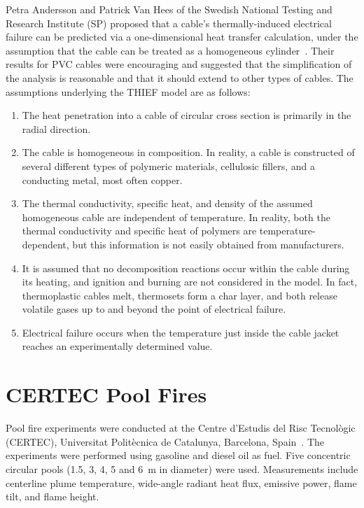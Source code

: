 Petra Andersson and Patrick Van Hees of the Swedish National Testing and Research Institute (SP) proposed that a cable's thermally-induced electrical failure can be predicted via a one-dimensional heat transfer calculation, under the assumption that the cable can be treated as a homogeneous cylinder~\cite{Andersson:2005}. Their results for PVC cables were encouraging and suggested that the simplification of the analysis is reasonable and that it should extend to other types of cables. The assumptions underlying the THIEF model are as follows:
\begin{enumerate}
\item The heat penetration into a cable of circular cross section is primarily in the radial direction.
\item The cable is homogeneous in composition. In reality, a cable is constructed of several different types of polymeric materials, cellulosic fillers, and a conducting metal, most often copper.
\item The thermal conductivity, specific heat, and density of the assumed homogeneous cable are independent of temperature. In reality, both the thermal conductivity and specific heat of polymers are temperature-dependent, but this information is not easily obtained from manufacturers.
\item It is assumed that no decomposition reactions occur within the cable during its heating, and ignition and burning are not considered in the model. In fact, thermoplastic cables melt, thermosets form a char layer, and both release volatile gases up to and beyond the point of electrical failure.
\item Electrical failure occurs when the temperature just inside the cable jacket reaches an experimentally determined value.
\end{enumerate}


\section{CERTEC Pool Fires}
\label{CERTEC_Pool_Fires_Description}

Pool fire experiments were conducted at the Centre d’Estudis del Risc Tecnol\`{o}gic (CERTEC), Universitat Polit\`{e}cnica de Catalunya, Barcelona, Spain~\cite{Munoz:JHM2007}. The experiments were performed using gasoline and diesel oil as fuel. Five concentric circular pools (1.5, 3, 4, 5 and 6~m in diameter) were used. Measurements include centerline plume temperature, wide-angle radiant heat flux, emissive power, flame tilt, and flame height.


